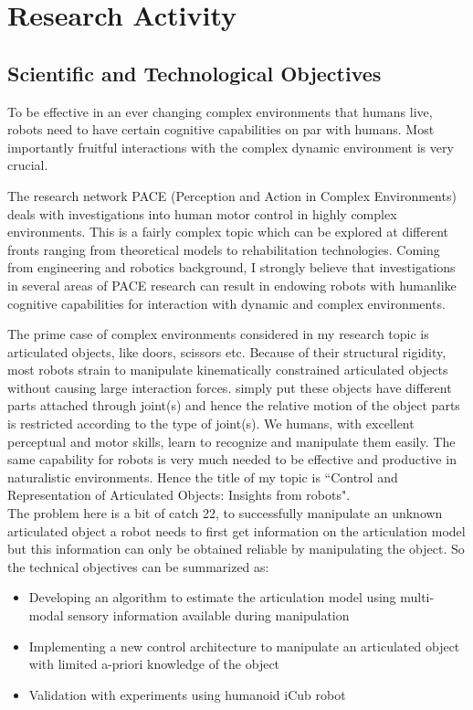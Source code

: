 \documentclass[12pt,a4paper]{report}
\begin{document}
\section{Research Activity}
\subsection{Scientific and Technological Objectives}

To be effective in an ever changing complex environments that humans live, robots need to have certain cognitive capabilities on par with humans. Most importantly fruitful interactions with the complex dynamic environment is very crucial. 

The research network PACE (Perception and Action in Complex Environments) deals with investigations into human motor control in highly complex environments. This is a fairly complex topic which can be explored at different fronts ranging from theoretical models to rehabilitation technologies. Coming from engineering and robotics background, I strongly believe that investigations in several areas of PACE research can result in endowing robots with humanlike cognitive capabilities for interaction with dynamic and complex environments. 

The prime case of complex environments considered in my research topic is articulated objects, like doors, scissors etc. Because of their structural rigidity, most robots strain to manipulate kinematically constrained articulated objects without causing large interaction forces. simply put these objects have different parts attached through joint(s) and hence the relative motion of the object parts is restricted according to the type of joint(s). We humans, with excellent perceptual and motor skills, learn to recognize and manipulate them easily. The same capability for robots is very much needed to be effective and productive in naturalistic environments. Hence the title of my topic is ``Control and Representation of Articulated Objects: Insights from robots". \\

The problem here is a bit of catch 22, to successfully manipulate an unknown articulated object a robot needs to first get information on the articulation model but this information can only be obtained reliable by manipulating the object. So the technical objectives can be summarized as:

\begin{itemize}
	\item Developing an algorithm to estimate the articulation model using multi-modal sensory information available during manipulation
	\item Implementing a new control architecture to manipulate an articulated object with limited a-priori knowledge of the object
	\item Validation with experiments using humanoid iCub robot
\end{itemize}
\end{document}
